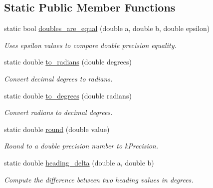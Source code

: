 \subsection*{Static Public Member Functions}
\begin{DoxyCompactItemize}
\item 
static bool \hyperlink{classgeo_1_1Spatial_a038ae4ddfdb9c89ce9bb3d55f4e6daa7}{doubles\+\_\+are\+\_\+equal} (double a, double b, double epsilon)
\begin{DoxyCompactList}\small\item\em Uses epsilon values to compare double precision equality. \end{DoxyCompactList}\item 
static double \hyperlink{classgeo_1_1Spatial_a70141094fae0f0fabc90224bf1d7cd0f}{to\+\_\+radians} (double degrees)
\begin{DoxyCompactList}\small\item\em Convert decimal degrees to radians. \end{DoxyCompactList}\item 
static double \hyperlink{classgeo_1_1Spatial_a2bff1ce08e67dc3f6ca2ee90f97860e4}{to\+\_\+degrees} (double radians)
\begin{DoxyCompactList}\small\item\em Convert radians to decimal degrees. \end{DoxyCompactList}\item 
static double \hyperlink{classgeo_1_1Spatial_a820aa2d3891ef2c7c560cb71c88d24ba}{round} (double value)
\begin{DoxyCompactList}\small\item\em Round to a double precision number to k\+Precision. \end{DoxyCompactList}\item 
static double \hyperlink{classgeo_1_1Spatial_ae0055b6a137cb3159a097c70d3c7f375}{heading\+\_\+delta} (double a, double b)
\begin{DoxyCompactList}\small\item\em Compute the difference between two heading values in degrees. \end{DoxyCompactList}\end{DoxyCompactItemize}
